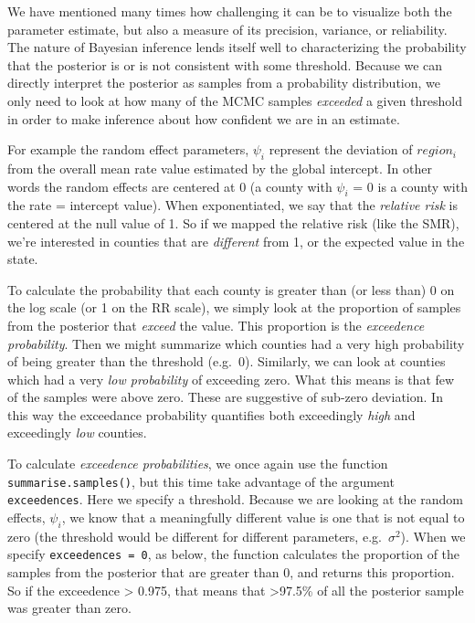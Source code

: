 \documentclass[
]{book}
\newcommand{\passthrough}[1]{#1}
\begin{document}
We have mentioned many times how challenging it can be to visualize both the parameter estimate, but also a measure of its precision, variance, or reliability. The nature of Bayesian inference lends itself well to characterizing the probability that the posterior is or is not consistent with some threshold. Because we can directly interpret the posterior as samples from a probability distribution, we only need to look at how many of the MCMC samples \emph{exceeded} a given threshold in order to make inference about how confident we are in an estimate.

For example the random effect parameters, \(\psi_i\) represent the deviation of \(region_i\) from the overall mean rate value estimated by the global intercept. In other words the random effects are centered at 0 (a county with \(\psi_i\) = 0 is a county with the rate = intercept value). When exponentiated, we say that the \emph{relative risk} is centered at the null value of 1. So if we mapped the relative risk (like the SMR), we're interested in counties that are \emph{different} from 1, or the expected value in the state.

To calculate the probability that each county is greater than (or less than) 0 on the log scale (or 1 on the RR scale), we simply look at the proportion of samples from the posterior that \emph{exceed} the value. This proportion is the \emph{exceedence probability}. Then we might summarize which counties had a very high probability of being greater than the threshold (e.g.~0). Similarly, we can look at counties which had a very \emph{low probability} of exceeding zero. What this means is that few of the samples were above zero. These are suggestive of sub-zero deviation. In this way the exceedance probability quantifies both exceedingly \emph{high} and exceedingly \emph{low} counties.

To calculate \emph{exceedence probabilities}, we once again use the function \passthrough{\lstinline!summarise.samples()!}, but this time take advantage of the argument \passthrough{\lstinline!exceedences!}. Here we specify a threshold. Because we are looking at the random effects, \(\psi_i\), we know that a meaningfully different value is one that is not equal to zero (the threshold would be different for different parameters, e.g.~\(\sigma^2\)). When we specify \passthrough{\lstinline!exceedences = 0!}, as below, the function calculates the proportion of the samples from the posterior that are greater than 0, and returns this proportion. So if the exceedence \textgreater{} 0.975, that means that \textgreater97.5\% of all the posterior sample was greater than zero.
\end{document}
